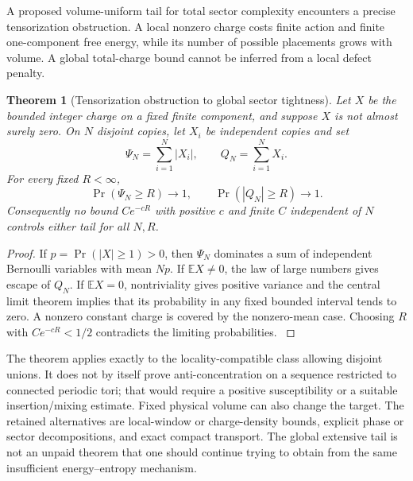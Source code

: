 \documentclass[11pt,oneside,openany]{book}
\newtheorem{theorem}{Theorem}[chapter]
\theoremstyle{definition}
\theoremstyle{remark}
\newcommand{\E}{\mathbb E}
\newcommand{\src}[2]{\cite[#2]{#1}}
\begin{document}
A proposed volume-uniform tail for total sector complexity encounters a precise tensorization obstruction. A local nonzero charge costs finite action and finite one-component free energy, while its number of possible placements grows with volume. A global total-charge bound cannot be inferred from a local defect penalty.

\begin{theorem}[Tensorization obstruction to global sector tightness]\label{thm:sector-no-go}
Let $X$ be the bounded integer charge on a fixed finite component, and suppose $X$ is not almost surely zero. On $N$ disjoint copies, let $X_i$ be independent copies and set
\[
\Psi_N=\sum_{i=1}^N|X_i|,\qquad Q_N=\sum_{i=1}^NX_i.
\]
For every fixed $R<\infty$,
\begin{equation}\label{eq:sector-escape}
\Pr(\Psi_N\ge R)\longrightarrow1,\qquad
\Pr(|Q_N|\ge R)\longrightarrow1.
\end{equation}
Consequently no bound $Ce^{-cR}$ with positive $c$ and finite $C$ independent of $N$ controls either tail for all $N,R$.
\end{theorem}
\begin{proof}
If $p=\Pr(|X|\ge1)>0$, then $\Psi_N$ dominates a sum of independent Bernoulli variables with mean $Np$. If $\E X\ne0$, the law of large numbers gives escape of $Q_N$. If $\E X=0$, nontriviality gives positive variance and the central limit theorem implies that its probability in any fixed bounded interval tends to zero. A nonzero constant charge is covered by the nonzero-mean case. Choosing $R$ with $Ce^{-cR}<1/2$ contradicts the limiting probabilities. \src{PAR}{V5}
\end{proof}

The theorem applies exactly to the locality-compatible class allowing disjoint unions. It does not by itself prove anti-concentration on a sequence restricted to connected periodic tori; that would require a positive susceptibility or a suitable insertion/mixing estimate. Fixed physical volume can also change the target. The retained alternatives are local-window or charge-density bounds, explicit phase or sector decompositions, and exact compact transport. The global extensive tail is not an unpaid theorem that one should continue trying to obtain from the same insufficient energy--entropy mechanism.
\end{document}
